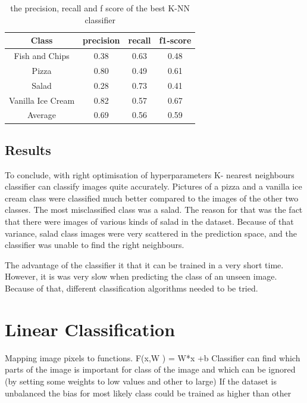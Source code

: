 \begin{table}[h!]
\begin{center}
\begin{tabular}{ |c|c|c|c| } 
 \hline
 Class & precision &   recall & f1-score  \\ \hline
 Fish and Chips    &   0.38   &   0.63  &    0.48   \\
            Pizza   &    0.80  &    0.49 &     0.61 \\
            Salad    &   0.28  &    0.73  &    0.41  \\
Vanilla Ice Cream     &  0.82  &    0.57   &   0.67   \\ \hline
     Average     &  0.69   &   0.56    &  0.59  \\
 \hline
\end{tabular}
\caption{the precision, recall and f score of the best K-NN classifier}
\label{table:1}
\end{center}
\end{table}


   

\subsection{Results}

To conclude, with right optimisation of hyperparameters K- nearest neighbours classifier can classify images quite accurately. Pictures of a pizza and a vanilla ice cream class were classified much better compared to the images of the other two classes. The most misclassified class was a salad. The reason for that was the fact that there were images of various kinds of salad in the dataset. Because of that variance, salad class images were very scattered in the prediction space, and the classifier was unable to find the right neighbours.

The advantage of the classifier it that it can be trained in a very short time. However, it is was very slow when predicting the class of an unseen image. Because of that, different classification algorithms needed to be tried.
\iffalse
\section{Linear Classification}

Mapping image pixels to functions. 
F(x,W ) = W*x +b
Classifier can find which parts of the image is important for class of the image and which can be ignored (by setting some weights to low values and other to large)
If the dataset is unbalanced the bias for most likely class could be trained as higher than other

